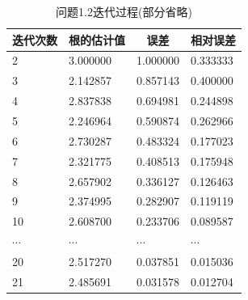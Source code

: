 \documentclass[UTF8]{ctexart}
\begin{document}
\begin{table}[]
	\centering
	\caption{问题1.2迭代过程(部分省略)}
	\label{t2}
	\begin{tabular}{llll}
		\hline
		\multicolumn{1}{c}{\textbf{迭代次数}} & \multicolumn{1}{c}{\textbf{根的估计值}} & \multicolumn{1}{c}{\textbf{误差}} & \multicolumn{1}{c}{\textbf{相对误差}} \\ \hline
		2                                 & 3.000000                           & 1.000000                        & 0.333333                          \\ \hline
		3                                 & 2.142857                           & 0.857143                        & 0.400000                          \\ \hline
		4                                 & 2.837838                           & 0.694981                        & 0.244898                          \\ \hline
		5                                 & 2.246964                           & 0.590874                        & 0.262966                          \\ \hline
		6                                 & 2.730287                           & 0.483324                        & 0.177023                          \\ \hline
		7                                 & 2.321775                           & 0.408513                        & 0.175948                          \\ \hline
		8                                 & 2.657902                           & 0.336127                        & 0.126463                          \\ \hline
		9                                 & 2.374995                           & 0.282907                        & 0.119119                          \\ \hline
		10                                & 2.608700                           & 0.233706                        & 0.089587                          \\ \hline
		$\cdots$                          & $\cdots$                           & $\cdots$                        & $\cdots$                          \\ \hline
		20                                & 2.517270                           & 0.037851                        & 0.015036                          \\ \hline
		21                                & 2.485691                           & 0.031578                        & 0.012704                          \\ \hline

\end{tabular}
\end{table}
\end{document}
